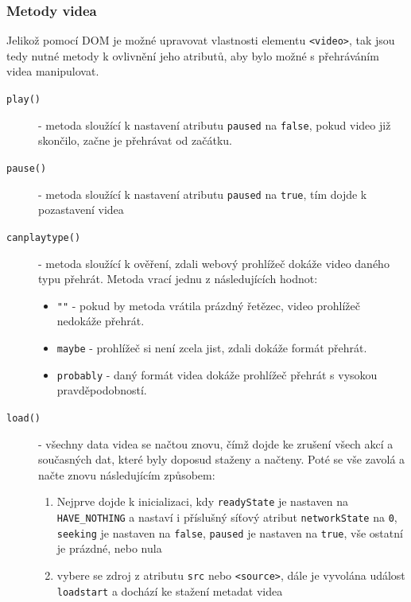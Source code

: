 \newpage

\subsubsection{Metody videa}
Jelikož pomocí DOM je možné upravovat vlastnosti elementu \texttt{<video>}, tak jsou tedy nutné metody k ovlivnění jeho atributů, aby bylo možné s přehráváním videa manipulovat.

\begin{description}
	\item[\texttt{play()}] - metoda sloužící k nastavení atributu \texttt{paused} na \texttt{false}, pokud video již skončilo, začne je přehrávat od začátku.
	\item[\texttt{pause()}] - metoda sloužící k nastavení atributu \texttt{paused} na \texttt{true}, tím dojde k pozastavení videa
	\item[\texttt{canplaytype()}] - metoda sloužící k ověření, zdali webový prohlížeč dokáže video daného typu přehrát. Metoda vrací jednu z následujících hodnot:
	 	\begin{itemize}		
			\item \texttt{""} - pokud by metoda vrátila prázdný řetězec, video prohlížeč nedokáže přehrát.
			\item \texttt{maybe} - prohlížeč si není zcela jist, zdali dokáže formát přehrát.
			\item \texttt{probably} - daný formát videa dokáže prohlížeč přehrát s vysokou pravděpodobností.
		\end{itemize}
	\item[\texttt{load()}] - všechny data videa se načtou znovu, čímž dojde ke zrušení všech akcí a současných dat, které byly doposud staženy a načteny. Poté se vše zavolá a načte znovu následujícím způsobem:
	 	\begin{enumerate}
			\item Nejprve dojde k inicializaci, kdy \texttt{readyState} je nastaven na \texttt{HAVE\_NOTHING} a  nastaví i příslušný síťový atribut \texttt{networkState} na \texttt{0}, \texttt{seeking} je nastaven na \texttt{false}, \texttt{paused} je nastaven na \texttt{true}, vše ostatní je prázdné, nebo nula	
			
			\item vybere se zdroj z atributu \texttt{src} nebo \texttt{<source>}, dále je vyvolána událost \texttt{loadstart} a dochází ke stažení metadat videa
			

\end{enumerate}
\end{description}
